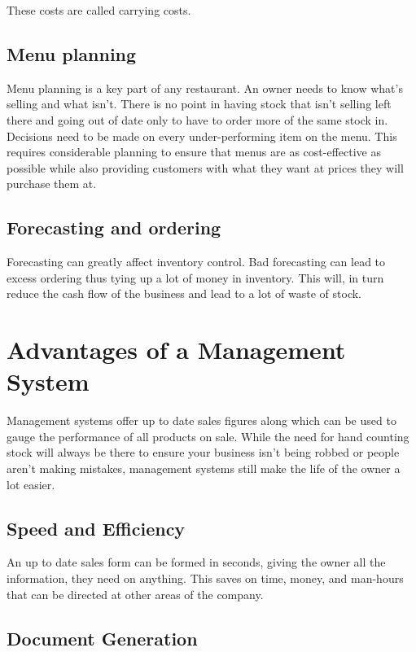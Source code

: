 These costs are called carrying costs.

\subsection{Menu planning}

Menu planning is a key part of any restaurant. An owner needs to know what’s selling and what isn’t. There is no point in having stock that isn’t selling left there and going out of date only to have to order more of the same stock in. Decisions need to be made on every under-performing item on the menu. This requires considerable planning to ensure that menus are as cost-effective as possible while also providing customers with what they want at prices they will purchase them at.

\subsection{Forecasting and ordering}
Forecasting can greatly affect inventory control. Bad forecasting can lead to excess ordering thus tying up a lot of money in inventory. This will, in turn reduce the cash flow of the business and lead to a lot of waste of stock. 
                    
\section{Advantages of a Management System}

Management systems offer up to date sales figures along which can be used to gauge the performance of all products on sale. While the need for hand counting stock will always be there to ensure your business isn’t being robbed or people aren’t making mistakes, management systems still make the life of the owner a lot easier.

\subsection{Speed and Efficiency}

An up to date sales form can be formed in seconds, giving the owner all the information, they need on anything. This saves on time, money, and man-hours that can be directed at other areas of the company.

\subsection{Document Generation}

